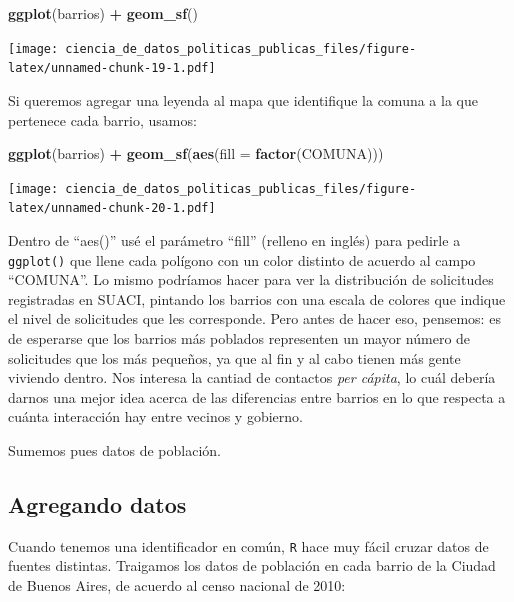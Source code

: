 \documentclass[]{book}
\newenvironment{Shaded}{\begin{snugshade}}{\end{snugshade}}
\newcommand{\KeywordTok}[1]{\textcolor[rgb]{0.13,0.29,0.53}{\textbf{#1}}}
\newcommand{\DataTypeTok}[1]{\textcolor[rgb]{0.13,0.29,0.53}{#1}}
\newcommand{\StringTok}[1]{\textcolor[rgb]{0.31,0.60,0.02}{#1}}
\newcommand{\OperatorTok}[1]{\textcolor[rgb]{0.81,0.36,0.00}{\textbf{#1}}}
\newcommand{\NormalTok}[1]{#1}
\begin{document}
\begin{Shaded}
\begin{Highlighting}[]
\KeywordTok{ggplot}\NormalTok{(barrios) }\OperatorTok{+}
\StringTok{    }\KeywordTok{geom_sf}\NormalTok{()}
\end{Highlighting}
\end{Shaded}

\texttt{[image: ciencia\_de\_datos\_politicas\_publicas\_files/figure-latex/unnamed-chunk-19-1.pdf]}

Si queremos agregar una leyenda al mapa que identifique la comuna a la
que pertenece cada barrio, usamos:

\begin{Shaded}
\begin{Highlighting}[]
\KeywordTok{ggplot}\NormalTok{(barrios) }\OperatorTok{+}
\StringTok{    }\KeywordTok{geom_sf}\NormalTok{(}\KeywordTok{aes}\NormalTok{(}\DataTypeTok{fill =} \KeywordTok{factor}\NormalTok{(COMUNA)))}
\end{Highlighting}
\end{Shaded}

\texttt{[image: ciencia\_de\_datos\_politicas\_publicas\_files/figure-latex/unnamed-chunk-20-1.pdf]}

Dentro de ``aes()'' usé el parámetro ``fill'' (relleno en inglés) para
pedirle a \texttt{ggplot()} que llene cada polígono con un color
distinto de acuerdo al campo ``COMUNA''. Lo mismo podríamos hacer para
ver la distribución de solicitudes registradas en SUACI, pintando los
barrios con una escala de colores que indique el nivel de solicitudes
que les corresponde. Pero antes de hacer eso, pensemos: es de esperarse
que los barrios más poblados representen un mayor número de solicitudes
que los más pequeños, ya que al fin y al cabo tienen más gente viviendo
dentro. Nos interesa la cantiad de contactos \emph{per cápita}, lo cuál
debería darnos una mejor idea acerca de las diferencias entre barrios en
lo que respecta a cuánta interacción hay entre vecinos y gobierno.

Sumemos pues datos de población.

\subsection{Agregando datos}\label{agregando-datos}

Cuando tenemos una identificador en común, \texttt{R} hace muy fácil
cruzar datos de fuentes distintas. Traigamos los datos de población en
cada barrio de la Ciudad de Buenos Aires, de acuerdo al censo nacional
de 2010:
\end{document}
